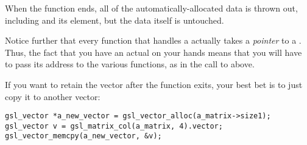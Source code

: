 When the function ends, all of the automatically-allocated data is
thrown out, including  and its
 element, but the data itself is untouched.

Notice further that every function that handles a
 actually takes a {\em pointer} to a 
. Thus, the fact that you have an actual 
 on your hands means that you will have to pass
its address to the various functions, as in the call to
 above.

If you want to retain the vector after the function exits, your best bet
is to just copy it to another vector:

\begin{lstlisting}
gsl_vector *a_new_vector = gsl_vector_alloc(a_matrix->size1);
gsl_vector v = gsl_matrix_col(a_matrix, 4).vector;
gsl_vector_memcpy(a_new_vector, &v);
\end{lstlisting}
